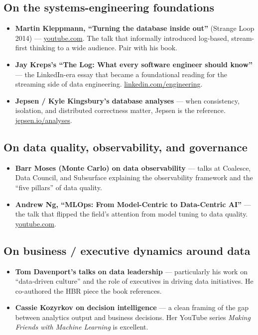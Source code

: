 \subsection*{On the systems-engineering foundations}

\begin{itemize}[leftmargin=*]
  \item \textbf{Martin Kleppmann, ``Turning the database inside out''} (Strange Loop 2014) --- \href{https://www.youtube.com/watch?v=fU9hR3kiOK0}{youtube.com}. The talk that informally introduced log-based, stream-first thinking to a wide audience. Pair with his book.
  \item \textbf{Jay Kreps's ``The Log: What every software engineer should know''} --- the LinkedIn-era essay that became a foundational reading for the streaming side of data engineering. \href{https://engineering.linkedin.com/distributed-systems/log-what-every-software-engineer-should-know-about-real-time-datas-unifying}{linkedin.com/engineering}.
  \item \textbf{Jepsen / Kyle Kingsbury's database analyses} --- when consistency, isolation, and distributed correctness matter, Jepsen is the reference. \href{https://jepsen.io/analyses}{jepsen.io/analyses}.
\end{itemize}

\subsection*{On data quality, observability, and governance}

\begin{itemize}[leftmargin=*]
  \item \textbf{Barr Moses (Monte Carlo) on data observability} --- talks at Coalesce, Data Council, and Subsurface explaining the observability framework and the ``five pillars'' of data quality.
  \item \textbf{Andrew Ng, ``MLOps: From Model-Centric to Data-Centric AI''} --- the talk that flipped the field's attention from model tuning to data quality. \href{https://www.youtube.com/watch?v=06-AZXmwHjo}{youtube.com}.
\end{itemize}

\subsection*{On business / executive dynamics around data}

\begin{itemize}[leftmargin=*]
  \item \textbf{Tom Davenport's talks on data leadership} --- particularly his work on ``data-driven culture'' and the role of executives in driving data initiatives. He co-authored the HBR piece the book references.
  \item \textbf{Cassie Kozyrkov on decision intelligence} --- a clean framing of the gap between analytics output and business decisions. Her YouTube series \emph{Making Friends with Machine Learning} is excellent.
\end{itemize}

